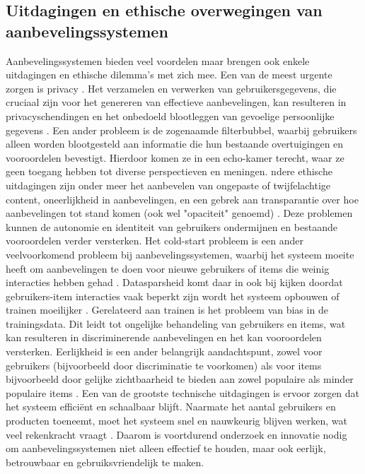 \subsection{Uitdagingen en ethische overwegingen van aanbevelingssystemen}
Aanbevelingssystemen bieden veel voordelen maar brengen ook enkele uitdagingen en ethische dilemma's met zich mee. Een van de meest urgente zorgen is privacy \autocite{Lex2023, Friedman2015, Li2017}. Het verzamelen en verwerken van gebruikersgegevens, die cruciaal zijn voor het genereren van effectieve aanbevelingen, kan resulteren in privacyschendingen en het onbedoeld blootleggen van gevoelige persoonlijke gegevens \autocite{Wang2018, Li2017}.
Een ander probleem is de zogenaamde filterbubbel, waarbij gebruikers alleen worden blootgesteld aan informatie die hun bestaande overtuigingen en vooroordelen bevestigt. Hierdoor komen ze in een echo-kamer terecht, waar ze geen toegang hebben tot diverse perspectieven en meningen. ndere ethische uitdagingen zijn onder meer het aanbevelen van ongepaste of twijfelachtige content, oneerlijkheid in aanbevelingen, en een gebrek aan transparantie over hoe aanbevelingen tot stand komen (ook wel "opaciteit" genoemd) \autocite{Milano2020}. Deze problemen kunnen de autonomie en identiteit van gebruikers ondermijnen en bestaande vooroordelen verder versterken.
Het cold-start probleem is een ander veelvoorkomend probleem bij aanbevelingssystemen, waarbij het systeem moeite heeft om aanbevelingen te doen voor nieuwe gebruikers of items die weinig interacties hebben gehad \autocite{Roy2022, Patel2023}. Datasparsheid komt daar in ook bij kijken doordat gebruikers-item interacties vaak beperkt zijn wordt het systeem opbouwen of trainen moeilijker \autocite{Roy2022, Patel2023}.
Gerelateerd aan trainen is het probleem van bias in de trainingsdata. Dit leidt tot ongelijke behandeling van gebruikers en items, wat kan resulteren in discriminerende aanbevelingen en het kan vooroordelen versterken. Eerlijkheid is een ander belangrijk aandachtspunt, zowel voor gebruikers (bijvoorbeeld door discriminatie te voorkomen) als voor items bijvoorbeeld door gelijke zichtbaarheid te bieden aan zowel populaire als minder populaire items \autocite{Wang2024}.
Een van de grootste technische uitdagingen is ervoor zorgen dat het systeem efficiënt en schaalbaar blijft. Naarmate het aantal gebruikers en producten toeneemt, moet het systeem snel en nauwkeurig blijven werken, wat veel rekenkracht vraagt \autocite{Roy2022, Patel2017}.
Daarom is voortdurend onderzoek en innovatie nodig om aanbevelingssystemen niet alleen effectief te houden, maar ook eerlijk, betrouwbaar en gebruiksvriendelijk te maken. 
